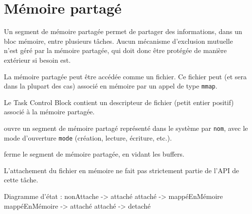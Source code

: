 \section{Mémoire partagé}
Un segment de mémoire partagée permet de partager des informations, dans un
bloc mémoire, entre plusieurs tâches. Aucun mécanisme d'exclusion mutuelle
n'est géré par la mémoire partagée, qui doit donc être protégée de
manière extérieur si besoin est.

La mémoire partagée peut être accédée comme un fichier. Ce fichier peut (et
sera dans la plupart des cas) associé en mémoire par un appel de type
\texttt{mmap}.

Le Task Control Block contient un descripteur de fichier (petit entier
positif) associé à la mémoire partagée.

    \begin{description}
	\item[\texttt{int mempart\_init(nom, mode)} : ] ouvre un segment de
	    mémoire partagé représenté dans le système par \texttt{nom}, avec le
	    mode d'ouverture \texttt{mode} (création, lecture, écriture, etc.).
	\item[\texttt{int mempart\_fermer(fd)} : ] ferme le segment de mémoire
	partagée, en vidant les buffers.
	\item L'attachement du fichier en mémoire ne fait pas strictement
	partie de l'API de cette tâche.
    \end{description}

Diagramme d'état :
nonAttache -> attaché
attaché -> mappéEnMémoire
mappéEnMémoire -> attaché
attaché -> detaché

